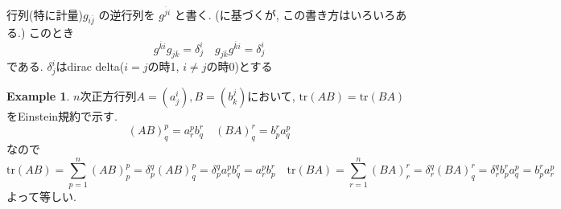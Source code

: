 \documentclass[dvipdfmx,a4paper,11pt]{article} %
\theoremstyle{definition}
\newtheorem{ex}[thm]{Example}
\theoremstyle{remark}
\numberwithin{equation}{section}
\begin{document}
行列(特に計量)$g_{i\overline{j}}$ の逆行列を $g^{\overline{j}i}$ と書く. (\cite[3章]{BG13}に基づくが, この書き方はいろいろある.) このとき
$$
g^{\overline{k}i}g_{j\overline{k}}=\delta_{j}^{i}
\quad 
g_{j\overline{k}}g^{\overline{k}i}=\delta_{j}^{i}
$$
である. $\delta_{j}^{i}$はdirac delta($i=j$の時1, $i \neq j$の時0)とする

\begin{ex}
$n$次正方行列$A=(a^{i}_{j}), B=(b^{j}_{k})$において, 
$\mathrm{tr}(AB)=\mathrm{tr}(BA)$をEinstein規約で示す.
$$
(AB)^{p}_{q}=a^{p}_{r}b^{r}_{q}
\quad 
(BA)^{r}_{q}=b^{r}_{p}a^{p}_{q}
$$
なので
$$
\mathrm{tr}(AB)=
\sum_{p=1}^{n}(AB)^{p}_{p}
=\delta_{p}^{q}(AB)^{p}_{q}
=\delta_{p}^{q}a^{p}_{r}b^{r}_{q}
=a^{p}_{r}b^{r}_{p}
\quad 
\mathrm{tr}(BA)
=\sum_{r=1}^{n}(BA)^{r}_{r}
=\delta_{r}^{q}(BA)^{r}_{q}
=\delta_{r}^{q} b^{r}_{p}a^{p}_{q}
=b^{r}_{p}a^{p}_{r}
$$
よって等しい. 
\end{ex}
\end{document}

